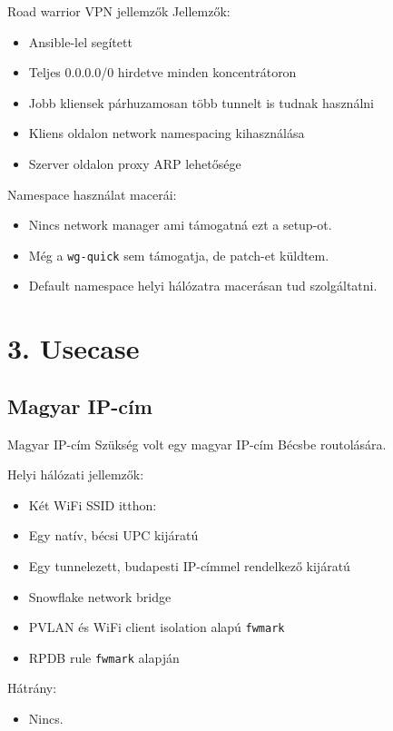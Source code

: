 \documentclass[aspectratio=169]{beamer}
\begin{document}
\begin{frame}{Road warrior VPN jellemzők}
	Jellemzők:
	\begin{itemize}
		\item Ansible-lel segített
			\pause
		\item Teljes 0.0.0.0/0 hirdetve minden koncentrátoron
			\pause
		\item Jobb kliensek párhuzamosan több tunnelt is tudnak használni
			\pause
		\item Kliens oldalon network namespacing kihasználása
			\pause
		\item Szerver oldalon proxy ARP lehetősége
			\pause
	\end{itemize}
			\pause
	Namespace használat macerái:
	\begin{itemize}
		\item Nincs network manager ami támogatná ezt a setup-ot.
			\pause
		\item Még a \texttt {wg-quick} sem támogatja, de patch-et küldtem.
			\pause
		\item Default namespace helyi hálózatra macerásan tud szolgáltatni.
	\end{itemize}
\end{frame}

\section{3. Usecase}
\begin{frame}[plain]
	\fontsize{50}{60} 
\end{frame}
\subsection{Magyar IP-cím}

\begin{frame}{Magyar IP-cím}
	Szükség volt egy magyar IP-cím Bécsbe routolására.

	Helyi hálózati jellemzők:
	\begin{itemize}
		\item Két WiFi SSID itthon:
			\pause
		\item Egy natív, bécsi UPC kijáratú
			\pause
		\item Egy tunnelezett, budapesti IP-címmel rendelkező kijáratú
			\pause
		\item Snowflake network bridge
			\pause
		\item PVLAN és WiFi client isolation alapú \texttt{fwmark}
			\pause
		\item RPDB rule \texttt{fwmark} alapján
	\end{itemize}
	\pause
	Hátrány:
	\begin{itemize}
		\item Nincs.
	\end{itemize}
\end{frame}
\end{document}
